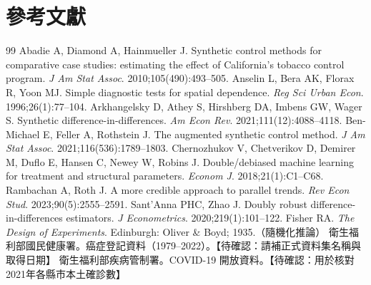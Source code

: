\documentclass[UTF8,a4paper,11pt]{ctexart}
\newcommand{\note}[1]{\textcolor{red!60!black}{【待確認：#1】}}
\begin{document}
\section*{參考文獻}
\begin{small}
\begin{thebibliography}{99}
   Abadie A, Diamond A, Hainmueller J. Synthetic control methods for comparative case studies: estimating the effect of California's tobacco control program. \emph{J Am Stat Assoc}. 2010;105(490):493--505.
   Anselin L, Bera AK, Florax R, Yoon MJ. Simple diagnostic tests for spatial dependence. \emph{Reg Sci Urban Econ}. 1996;26(1):77--104.
   Arkhangelsky D, Athey S, Hirshberg DA, Imbens GW, Wager S. Synthetic difference-in-differences. \emph{Am Econ Rev}. 2021;111(12):4088--4118.
   Ben-Michael E, Feller A, Rothstein J. The augmented synthetic control method. \emph{J Am Stat Assoc}. 2021;116(536):1789--1803.
   Chernozhukov V, Chetverikov D, Demirer M, Duflo E, Hansen C, Newey W, Robins J. Double/debiased machine learning for treatment and structural parameters. \emph{Econom J}. 2018;21(1):C1--C68.
   Rambachan A, Roth J. A more credible approach to parallel trends. \emph{Rev Econ Stud}. 2023;90(5):2555--2591.
   Sant'Anna PHC, Zhao J. Doubly robust difference-in-differences estimators. \emph{J Econometrics}. 2020;219(1):101--122.
   Fisher RA. \emph{The Design of Experiments}. Edinburgh: Oliver \& Boyd; 1935.（隨機化推論）
   衛生福利部國民健康署。癌症登記資料（1979--2022）。\note{請補正式資料集名稱與取得日期}
   衛生福利部疾病管制署。COVID-19 開放資料。\note{用於核對2021年各縣市本土確診數}
\end{thebibliography}
\end{small}
\end{document}

